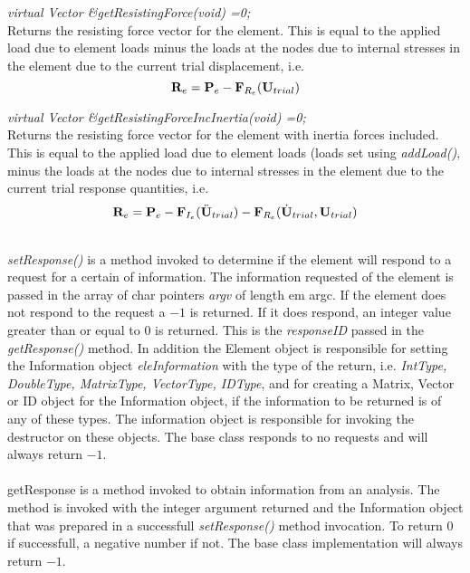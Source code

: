 {\em virtual Vector \&getResistingForce(void) =0;} \\
Returns the resisting force vector for the element. This is equal to
the applied load due to element loads minus the loads at the nodes due
to internal stresses in the element due to the current trial
displacement, i.e. 
$$
{\bf R}_e = 
{\bf P}_{e} - {\bf F}_{R_e}({\bf U}_{trial}) 
$$

{\em virtual Vector \&getResistingForceIncInertia(void) =0;} \\
Returns the resisting force vector for the element with inertia forces
included. This is equal to the applied load due to element loads
(loads set using {\em addLoad()}, minus the loads at the nodes due to
internal stresses in the element due to the current trial response
quantities, i.e.
$$
{\bf R}_e = 
{\bf P}_e -  {\bf F}_{I_e} (\ddot {{\bf U}}_{trial}) - {\bf F}_{R_e}(\dot
{{\bf U}}_{trial}, {\bf U}_{trial})
$$


\\
{\em setResponse()} is a method invoked to determine if the element
will respond to a request for a certain of information. The
information requested of the element is passed in the array of char
pointers {\em argv} of length {em argc}. If the element does not
respond to the request a $-1$ is returned. If it does respond, an
integer value greater than or equal to $0$ is returned. This is the
{\em responseID} passed in the {\em getResponse()} method. In addition
the Element object is responsible for setting the Information object
{\em eleInformation} with the type of the return, i.e. {\em IntType,
DoubleType, MatrixType, VectorType, IDType}, and for creating a Matrix,
Vector or ID object for the Information object, if the information to
be returned is of any of these types. The information object is
responsible for invoking the destructor on these objects. The base
class responds to no requests and will always return $-1$. \\

\\ 
getResponse is a method invoked to obtain information from an
analysis. The method is invoked with the integer argument returned and
the Information object that was prepared in a successfull {\em
setResponse()} method invocation. To return $0$ if successfull, a
negative number if not. The base class implementation will always
return $-1$. 
